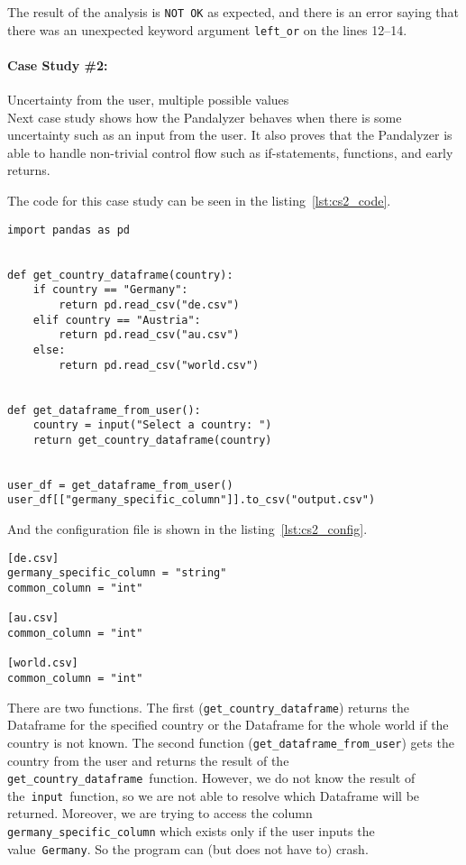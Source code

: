 The result of the analysis is \verb|NOT OK| as expected, and there is an error saying that there was an unexpected
keyword argument \verb|left_or| on the lines 12--14.


\paragraph{Case Study \#2:} Uncertainty from the user, multiple possible values \\

Next case study shows how the Pandalyzer behaves when there is some uncertainty such as an input from the user.
It also proves that the Pandalyzer is able to handle non-trivial control flow such as if-statements, functions, and
early returns.

The code for this case study can be seen in the listing~\ref{lst:cs2_code}.

\begin{lstlisting}[caption=Code of the second case study in Pandas, label={lst:cs2_code}, captionpos=b]
import pandas as pd


def get_country_dataframe(country):
    if country == "Germany":
        return pd.read_csv("de.csv")
    elif country == "Austria":
        return pd.read_csv("au.csv")
    else:
        return pd.read_csv("world.csv")


def get_dataframe_from_user():
    country = input("Select a country: ")
    return get_country_dataframe(country)


user_df = get_dataframe_from_user()
user_df[["germany_specific_column"]].to_csv("output.csv")
\end{lstlisting}

And the configuration file is shown in the listing~\ref{lst:cs2_config}.

\begin{lstlisting}[caption=config.toml file for the second case study, label={lst:cs2_config}, captionpos=b]
[de.csv]
germany_specific_column = "string"
common_column = "int"

[au.csv]
common_column = "int"

[world.csv]
common_column = "int"
\end{lstlisting}

There are two functions.
The first (\verb|get_country_dataframe|) returns the Dataframe for the specified country or the Dataframe for the whole
world if the country is not known.
The second function (\verb|get_dataframe_from_user|) gets the country from the user and returns the result of the~
\verb|get_country_dataframe|~function.
However, we do not know the result of the~\verb|input|~function, so we are not able to resolve which Dataframe will
be returned.
Moreover, we are trying to access the column \verb|germany_specific_column| which exists only if the user inputs
the value~\verb|Germany|.
So the program can (but does not have to) crash.

